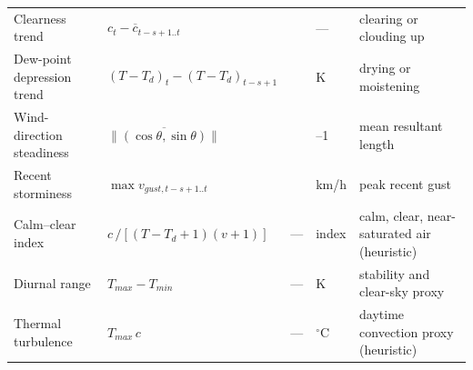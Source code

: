 \begin{table}[!ht]
\begin{tabular}{>{\raggedright\arraybackslash}p{2.7cm}>{\raggedright\arraybackslash}p{5.0cm}>{\raggedright\arraybackslash}p{2.9cm}>{\raggedright\arraybackslash}p{1.3cm}>{\raggedright\arraybackslash}p{2.9cm}}
Clearness trend & $c_t - \overline{c}_{t-s+1..t}$ &  & — & clearing or clouding up \\
Dew-point depression trend & $(T-T_d)_t - (T-T_d)_{t-s+1}$ &  & K & drying or moistening \\
Wind-direction steadiness & $\|\overline{(\cos\theta,\sin\theta)}\|$ &  & 0--1 & mean resultant length \\
Recent storminess & $\max v_{gust,t-s+1..t}$ &  & km/h & peak recent gust \\
Calm--clear index & $c\,/[(T-T_d+1)(v+1)]$ & — & index & calm, clear, near-saturated air (heuristic) \\
Diurnal range & $T_{max}-T_{min}$ & — & K & stability and clear-sky proxy \\
Thermal turbulence & $T_{max}\,c$ & — & $^\circ$C & daytime convection proxy (heuristic) \\
\bottomrule
\end{tabular}
\end{table}
